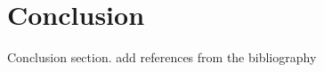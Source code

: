 \section{Conclusion}
Conclusion section.
add references from the bibliography \cite{einstein1935can}
